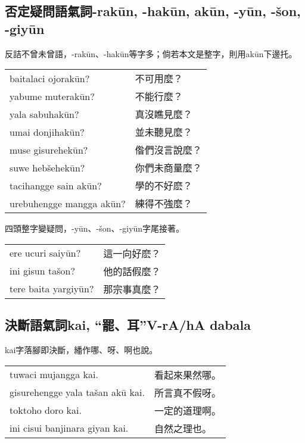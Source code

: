 \documentclass{article}
\begin{document}
\subsection{否定疑問語氣詞-rak\={u}n, -hak\={u}n, ak\={u}n, -y\={u}n, -\v{s}on, -giy\={u}n}
\noindent 反詰不曾未曾語，-rak\={u}n、-hak\={u}n等字多；倘若本文是整字，則用ak\={u}n下邊托。
\begin{center}
    \begin{tabularx}{\textwidth}{XX}
     baitalaci ojorak\={u}n? &不可用麼？\\
     yabume muterak\={u}n? &不能行麼？\\
     yala sabuhak\={u}n? &真沒瞧見麼？\\
     umai donjihak\={u}n?& 並未聽見麼？\\
     muse gisurehek\={u}n? &偺們沒言說麼？\\
     suwe heb\v{s}ehek\={u}n? &你們未商量麼？\\
     tacihangge sain ak\={u}n? &學的不好麽？\\
     urebuhengge mangga ak\={u}n? &練得不強麼？
    \end{tabularx}
\end{center}

\noindent 四頭整字變疑問，-y\={u}n、-\v{s}on、-giy\={u}n字尾接著。
\begin{center}
    \begin{tabularx}{\textwidth}{XX}
     ere ucuri saiy\={u}n? &這一向好麽？\\
     ini gisun ta\v{s}on? &他的話假麼？\\
     tere baita yargiy\={u}n? &那宗事真麼？
    \end{tabularx}
\end{center}

\subsection{決斷語氣詞kai, “罷、耳”V-rA/hA dabala}
\noindent kai字落腳即決斷，繙作哪、呀、啊也說。
\begin{center}
    \begin{tabularx}{\textwidth}{XX}
     tuwaci mujangga kai. &看起來果然哪。\\
     gisurehengge yala ta\v{s}an ak\={u} kai. &所言真不假呀。\\
     toktoho doro kai. &一定的道理啊。\\
     ini cisui banjinara giyan kai. &自然之理也。
    \end{tabularx}
\end{center}
\end{document}
